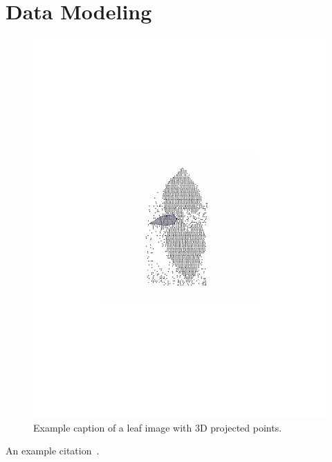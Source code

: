 \section{Data Modeling}
\label{sec:data}

\begin{figure}
\begin{center}
   \includegraphics[trim=200 250 200 270,clip,width=0.9\linewidth]{Figures/sampleLeaf}
\end{center}
   \caption{Example caption of a leaf image with $3$D projected points.}
\label{fig:long}
\label{fig:onecol}
\end{figure}

An example citation~\cite{Zhang2000}.
